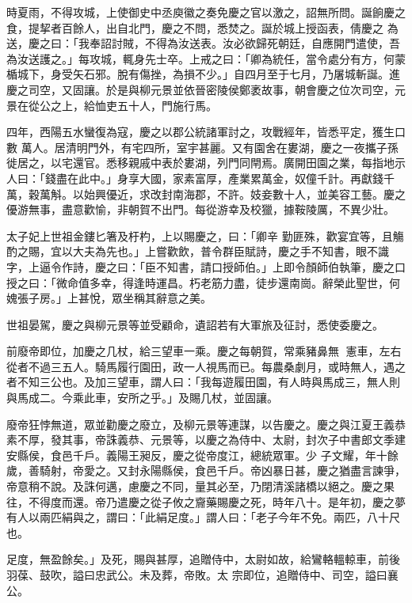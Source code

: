 \begin{pinyinscope}
 時夏雨，不得攻城，上使御史中丞庾徽之奏免慶之官以激之，詔無所問。誕餉慶之食，提挈者百餘人，出自北門，慶之不問，悉焚之。誕於城上授函表，倩慶之
 為送，慶之曰：「我奉詔討賊，不得為汝送表。汝必欲歸死朝廷，自應開門遣使，吾為汝送護之。」每攻城，輒身先士卒。上戒之曰：「卿為統任，當令處分有方，何蒙楯城下，身受矢石邪。脫有傷挫，為損不少。」自四月至于七月，乃屠城斬誕。進慶之司空，又固讓。於是與柳元景並依晉密陵侯鄭袤故事，朝會慶之位次司空，元景在從公之上，給恤吏五十人，門施行馬。



 四年，西陽五水蠻復為寇，慶之以郡公統諸軍討之，攻戰經年，皆悉平定，獲生口數
 萬人。居清明門外，有宅四所，室宇甚麗。又有園舍在婁湖，慶之一夜攜子孫徙居之，以宅還官。悉移親戚中表於婁湖，列門同閈焉。廣開田園之業，每指地示人曰：「錢盡在此中。」身享大國，家素富厚，產業累萬金，奴僮千計。再獻錢千萬，穀萬斛。以始興優近，求改封南海郡，不許。妓妾數十人，並美容工藝。慶之優游無事，盡意歡愉，非朝賀不出門。每從游幸及校獵，據鞍陵厲，不異少壯。



 太子妃上世祖金鏤匕箸及杅杓，上以賜慶之，曰：「卿辛
 勤匪殊，歡宴宜等，且觴酌之賜，宜以大夫為先也。」上嘗歡飲，普令群臣賦詩，慶之手不知書，眼不識字，上逼令作詩，慶之曰：「臣不知書，請口授師伯。」上即令顏師伯執筆，慶之口授之曰：「微命值多幸，得逢時運昌。朽老筋力盡，徒步還南崗。辭榮此聖世，何媿張子房。」上甚悅，眾坐稱其辭意之美。



 世祖晏駕，慶之與柳元景等並受顧命，遺詔若有大軍旅及征討，悉使委慶之。



 前廢帝即位，加慶之几杖，給三望車一乘。慶之每朝賀，常乘豬鼻無
 憲車，左右從者不過三五人。騎馬履行園田，政一人視馬而已。每農桑劇月，或時無人，遇之者不知三公也。及加三望車，謂人曰：「我每遊履田園，有人時與馬成三，無人則與馬成二。今乘此車，安所之乎。」及賜几杖，並固讓。



 廢帝狂悖無道，眾並勸慶之廢立，及柳元景等連謀，以告慶之。慶之與江夏王義恭素不厚，發其事，帝誅義恭、元景等，以慶之為侍中、太尉，封次子中書郎文季建安縣侯，食邑千戶。義陽王昶反，慶之從帝度江，總統眾軍。少
 子文耀，年十餘歲，善騎射，帝愛之。又封永陽縣侯，食邑千戶。帝凶暴日甚，慶之猶盡言諫爭，帝意稍不說。及誅何邁，慮慶之不同，量其必至，乃閉清溪諸橋以絕之。慶之果往，不得度而還。帝乃遣慶之從子攸之齎藥賜慶之死，時年八十。是年初，慶之夢有人以兩匹絹與之，謂曰：「此絹足度。」謂人曰：「老子今年不免。兩匹，八十尺也。



 足度，無盈餘矣。」及死，賜與甚厚，追贈侍中，太尉如故，給鸞輅轀輬車，前後羽葆、鼓吹，謚曰忠武公。未及葬，帝敗。太
 宗即位，追贈侍中、司空，謚曰襄公。




\end{pinyinscope}
